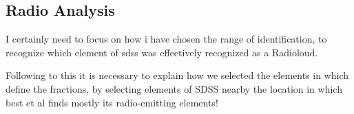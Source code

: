 \subsection{Radio Analysis}
I certainly need to focus on how i have chosen the range of identification, to recognize which element of sdss was effectively recognized as a Radioloud.

Following to this it is necessary to explain how we selected the elements in which define the fractions, by selecting elements of SDSS nearby the location in which best et al finds mostly its radio-emitting elements!